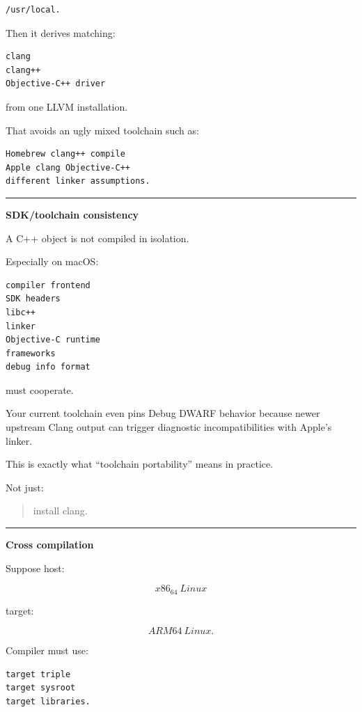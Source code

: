 \begin{verbatim}
/usr/local.
\end{verbatim}

Then it derives matching:

\begin{verbatim}
clang
clang++
Objective-C++ driver
\end{verbatim}

from one LLVM installation.

That avoids an ugly mixed toolchain such as:

\begin{verbatim}
Homebrew clang++ compile
Apple clang Objective-C++
different linker assumptions.
\end{verbatim}

\begin{center}\rule{0.5\linewidth}{0.5pt}\end{center}

\textbf{SDK/toolchain consistency}

A C++ object is not compiled in isolation.

Especially on macOS:

\begin{verbatim}
compiler frontend
SDK headers
libc++
linker
Objective-C runtime
frameworks
debug info format
\end{verbatim}

must cooperate.

Your current toolchain even pins Debug DWARF behavior because newer upstream Clang output can trigger diagnostic incompatibilities with Apple's linker.

This is exactly what ``toolchain portability'' means in practice.

Not just:

\begin{quote}
install clang.
\end{quote}

\begin{center}\rule{0.5\linewidth}{0.5pt}\end{center}

\textbf{Cross compilation}

Suppose host:

\[
x86_64\ Linux
\]

target:

\[
ARM64\ Linux.
\]

Compiler must use:

\begin{verbatim}
target triple
target sysroot
target libraries.
\end{verbatim}

